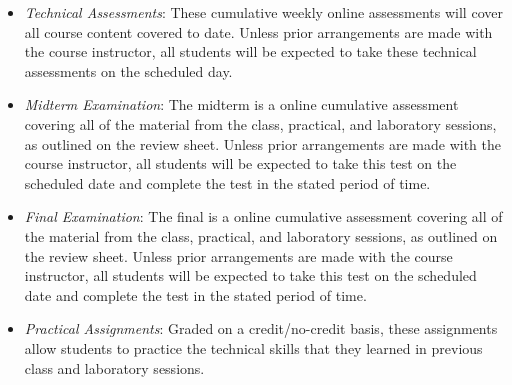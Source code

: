 \documentclass[11pt]{article}
\begin{document}
\begin{itemize}


  \item {\em Technical Assessments\/}: These cumulative weekly online
    assessments will cover all course content covered to date. Unless prior
    arrangements are made with the course instructor, all students will be
    expected to take these technical assessments on the scheduled day.

  \item {\em Midterm Examination\/}: The midterm is a online cumulative
    assessment covering all of the material from the class, practical, and
    laboratory sessions, as outlined on the review sheet. Unless prior
    arrangements are made with the course instructor, all students will be
    expected to take this test on the scheduled date and complete the test in
    the stated period of time.

  \item {\em Final Examination\/}: The final is a online cumulative assessment
    covering all of the material from the class, practical, and laboratory
    sessions, as outlined on the review sheet. Unless prior arrangements are
    made with the course instructor, all students will be expected to take this
    test on the scheduled date and complete the test in the stated period of
    time.


  \item {\em Practical Assignments\/}: Graded on a credit/no-credit basis, these
    assignments allow students to practice the technical skills that they
    learned in previous class and laboratory sessions.


\end{itemize}
\end{document}
